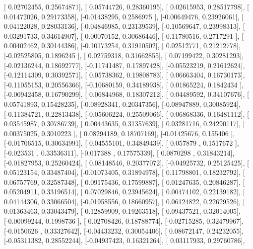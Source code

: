 \documentclass{article}
\begin{document}
       [ 0.02702455,  0.25674871],
       [ 0.05744726,  0.28360195],
       [ 0.02615953,  0.28517798],
       [ 0.01472026,  0.29173358],
       [-0.01438295,  0.2586975 ],
       [-0.00649476,  0.23926061],
       [ 0.04122028,  0.28033136],
       [-0.04846985,  0.23139539],
       [-0.10569647,  0.23998313],
       [ 0.03291733,  0.34614907],
       [ 0.00070152,  0.30686446],
       [-0.11780516,  0.2717291 ],
       [ 0.00402462,  0.30144386],
       [-0.10173254,  0.31910502],
       [ 0.02512771,  0.21212778],
       [-0.02525805,  0.1896245 ],
       [ 0.02759318,  0.31662855],
       [ 0.07199422,  0.30281293],
       [-0.02136244,  0.18692777],
       [-0.11741487,  0.17897428],
       [-0.05523219,  0.21612624],
       [-0.12114309,  0.30392571],
       [ 0.05738362,  0.19808783],
       [ 0.06663404,  0.16730173],
       [-0.11055153,  0.20556366],
       [-0.10680159,  0.34189938],
       [ 0.01865224,  0.1842434 ],
       [-0.00942458,  0.16790299],
       [ 0.06844968,  0.18307212],
       [ 0.04489592,  0.34107676],
       [ 0.05741893,  0.15428235],
       [-0.08928341,  0.20347356],
       [-0.08947889,  0.30085924],
       [-0.11384721,  0.22813438],
       [-0.05606224,  0.25509066],
       [ 0.06868336,  0.16481112],
       [ 0.03545987,  0.30786739],
       [ 0.00443635,  0.31357639],
       [ 0.03281716,  0.24290117],
       [ 0.00375025,  0.3010223 ],
       [ 0.08294189,  0.18707169],
       [-0.01425676,  0.155406  ],
       [-0.01706515,  0.30634991],
       [ 0.04555101,  0.34849439],
       [ 0.057879  ,  0.1517672 ],
       [-0.023531  ,  0.33536311],
       [-0.017388  ,  0.17575339],
       [ 0.0870298 ,  0.31843214],
       [-0.01827953,  0.25260424],
       [ 0.08148546,  0.20377072],
       [-0.04925732,  0.25125425],
       [ 0.05123154,  0.33487404],
       [-0.01073405,  0.31894978],
       [ 0.11798801,  0.18232792],
       [ 0.06757769,  0.32587348],
       [ 0.09175436,  0.17599887],
       [ 0.01247635,  0.20846287],
       [ 0.05204911,  0.33196514],
       [ 0.07029846,  0.23945624],
       [ 0.00474102,  0.22139182],
       [ 0.04144306,  0.33066504],
       [-0.01958556,  0.18660957],
       [ 0.06124822,  0.22629526],
       [ 0.01363463,  0.33043479],
       [ 0.12859909,  0.19263518],
       [ 0.09437521,  0.32014005],
       [-0.00099244,  0.1998736 ],
       [ 0.02708426,  0.18788774],
       [-0.02715285,  0.32479967],
       [-0.0150626 ,  0.33327642],
       [-0.04433232,  0.30054406],
       [ 0.08672147,  0.24232055],
       [-0.05311382,  0.28552244],
       [-0.04937423,  0.16321264],
       [ 0.03117933,  0.29760786],
\end{document}
